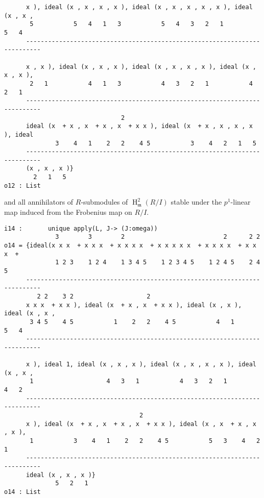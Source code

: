 \documentclass[11pt]{amsart}
\DeclareMathOperator{\HH}{H}
\begin{document}
\begin{example}
\begin{verbatim}
      x ), ideal (x , x , x , x ), ideal (x , x , x , x , x ), ideal (x , x ,
       5           5   4   1   3           5   4   3   2   1           5   4 
      --------------------------------------------------------------------------
                                                                              
      x , x ), ideal (x , x , x ), ideal (x , x , x , x ), ideal (x , x , x ),
       2   1           4   1   3           4   3   2   1           4   2   1  
      --------------------------------------------------------------------------
                                2
      ideal (x  + x , x  + x , x  + x x ), ideal (x  + x , x , x , x ), ideal
              3    4   1    2   2    4 5           3    4   2   1   5        
      --------------------------------------------------------------------------
      (x , x , x )}
        2   1   5
o12 : List
\end{verbatim}
and all annihilators of $R$-submodules of $\HH^2_{\mathfrak{m}} (R/I)$ stable under the $p^1$-linear map induced from the Frobenius map on $R/I$.
\begin{verbatim}
i14 :       unique apply(L, J-> (J:omega))
              3        3        2                           2      2 2    
o14 = {ideal(x x x  + x x x  + x x x x  + x x x x x  + x x x x  + x x x  +
              1 2 3    1 2 4    1 3 4 5    1 2 3 4 5    1 2 4 5    2 4 5  
      --------------------------------------------------------------------------
         2 2    3 2                    2                                        
      x x x  + x x ), ideal (x  + x , x  + x x ), ideal (x , x ), ideal (x , x ,
       3 4 5    4 5           1    2   2    4 5           4   1           5   4 
      --------------------------------------------------------------------------
                                                                              
      x ), ideal 1, ideal (x , x , x ), ideal (x , x , x , x ), ideal (x , x ,
       1                    4   3   1           4   3   2   1           4   2 
      --------------------------------------------------------------------------
                                     2
      x ), ideal (x  + x , x  + x , x  + x x ), ideal (x , x  + x , x , x ),
       1           3    4   1    2   2    4 5           5   3    4   2   1  
      --------------------------------------------------------------------------
      ideal (x , x , x )}
              5   2   1
o14 : List
\end{verbatim}

\end{example}
\end{document}
